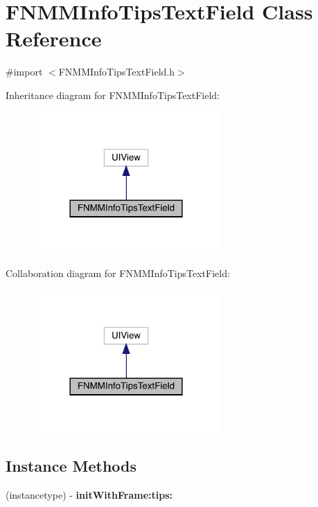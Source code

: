 \hypertarget{interface_f_n_m_m_info_tips_text_field}{}\section{F\+N\+M\+M\+Info\+Tips\+Text\+Field Class Reference}
\label{interface_f_n_m_m_info_tips_text_field}


{\ttfamily \#import $<$F\+N\+M\+M\+Info\+Tips\+Text\+Field.\+h$>$}



Inheritance diagram for F\+N\+M\+M\+Info\+Tips\+Text\+Field\+:\nopagebreak
\begin{figure}[H]
\begin{center}
\leavevmode
\includegraphics[width=201pt]{interface_f_n_m_m_info_tips_text_field__inherit__graph}
\end{center}
\end{figure}


Collaboration diagram for F\+N\+M\+M\+Info\+Tips\+Text\+Field\+:\nopagebreak
\begin{figure}[H]
\begin{center}
\leavevmode
\includegraphics[width=201pt]{interface_f_n_m_m_info_tips_text_field__coll__graph}
\end{center}
\end{figure}
\subsection*{Instance Methods}
\begin{DoxyCompactItemize}
\item 
\mbox{\label{interface_f_n_m_m_info_tips_text_field_a4887748c02ceca52148cbea14c53b2b3}} 
(instancetype) -\/ {\bfseries init\+With\+Frame\+:tips\+:}
\end{DoxyCompactItemize}
